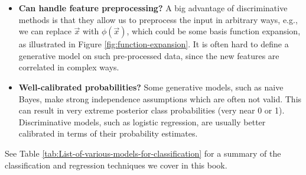 \begin{itemize}
\item{\textbf{Can handle feature preprocessing?} A big advantage of discriminative methods is that they allow us to preprocess the input in arbitrary ways, e.g., we can replace $\vec{x}$ with $\phi(\vec{x})$, which could be some basis function expansion, as illustrated in Figure \ref{fig:function-expansion}. It is often hard to define a generative model on such pre-processed data, since the new features are correlated in complex ways.}

\item{\textbf{Well-calibrated probabilities?} Some generative models, such as naive Bayes, make strong independence assumptions which are often not valid. This can result in very extreme posterior class probabilities (very near 0 or 1). Discriminative models, such as logistic regression, are usually better calibrated in terms of their probability estimates.}
\end{itemize}

See Table \ref{tab:List-of-various-models-for-classification} for a summary of the classification and regression techniques we cover in this book.


